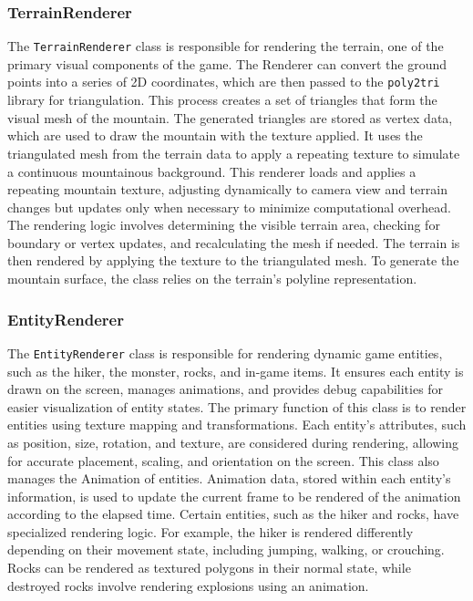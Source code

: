 \subsubsection{TerrainRenderer}

The \texttt{TerrainRenderer} class is responsible for rendering the terrain, one of the primary visual components of the game.
The Renderer can convert the ground points into a series of 2D coordinates, which are then passed to the \texttt{poly2tri} library \cite{poly2tri} for triangulation.
This process creates a set of triangles that form the visual mesh of the mountain.
The generated triangles are stored as vertex data, which are used to draw the mountain with the texture applied.
It uses the triangulated mesh from the terrain data to apply a repeating texture to simulate a continuous mountainous background.
      This renderer loads and applies a repeating mountain texture, adjusting dynamically to camera view and terrain changes but updates only when necessary to minimize computational overhead.
      The rendering logic involves determining the visible terrain area, checking for boundary or vertex updates, and recalculating the mesh if needed. 
      The terrain is then rendered by applying the texture to the triangulated mesh.
To generate the mountain surface, the class relies on the terrain's polyline representation.

    \subsubsection{EntityRenderer}

      The \texttt{EntityRenderer} class is responsible for rendering dynamic game entities, such as the hiker, the monster, rocks, and in-game items. 
      It ensures each entity is drawn on the screen, manages animations, and provides debug capabilities for easier visualization of entity states. 
      The primary function of this class is to render entities using texture mapping and transformations. 
      Each entity’s attributes, such as position, size, rotation, and texture, are considered during rendering, allowing for accurate placement, scaling, and orientation on the screen.
This class also manages the Animation of entities.
Animation data, stored within each entity’s information, is used to update the current frame to be rendered of the animation according to the elapsed time.
      Certain entities, such as the hiker and rocks, have specialized rendering logic. 
      For example, the hiker is rendered differently depending on their movement state, including jumping, walking, or crouching. 
      Rocks can be rendered as textured polygons in their normal state, while destroyed rocks involve rendering explosions using an animation.
      

